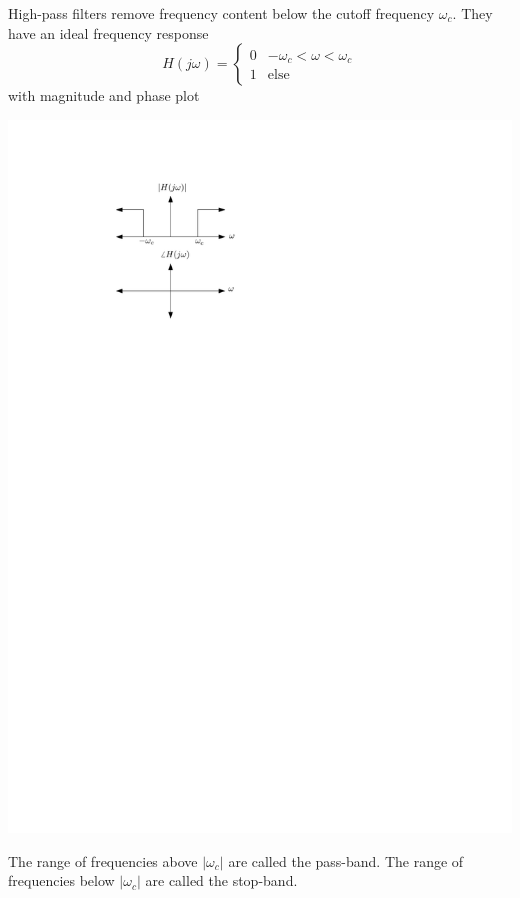 High-pass filters remove frequency content below the cutoff frequency $\omega_c$. They have an ideal frequency response
\[
H(j\omega) = \left\{ \begin{array}{lc}
  0 & -\omega_c < \omega < \omega_c\\
  1 & \text{else}
\end{array}
\right. 
\]
with magnitude and phase plot
\begin{center}
  \includegraphics[scale=1]{graphics/highpass-ideal.pdf}
\end{center}
The range of frequencies above $|\omega_c|$ are called the pass-band. The range of frequencies below $|\omega_c|$ are called the stop-band.

